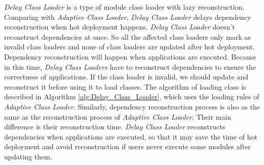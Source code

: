 \documentclass[conference]{IEEEtran}
\begin{document}
\emph{Delay Class Loader} is a type of module class loader with lazy reconstruction.
Comparing with \emph{Adaptive Class Loader}, \emph{Delay Class Loader} delays dependency reconstruction when hot deployment happens.
\emph{Delay Class Loader} doesn't reconstruct dependencies at once. 
So all the affected class loaders only mark as invalid class loaders and none of class loaders are updated after hot deployment.
Dependency reconstruction will happen when applications are executed.
Because in this time, \emph{Delay Class Loaders} have to reconstruct dependencies to ensure the correctness of applications.
If the class loader is invalid, we should update and reconstruct it before using it to load classes. 
The algorithm of loading class is described in Algorithm \ref{alg:Delay_Class_Loader}, which uses the loading rules of \emph{Adaptive Class Loader}.
Similarly, dependency reconstruction process is also as the same as the reconstruction process of \emph{Adaptive Class Loader}.
Their main difference is their reconstruction time.
\emph{Delay Class Loader} reconstructs dependencies when applications are executed, so that it may save the time of hot deployment and avoid reconstruction if users never execute some modules after updating them.

\end{document}
